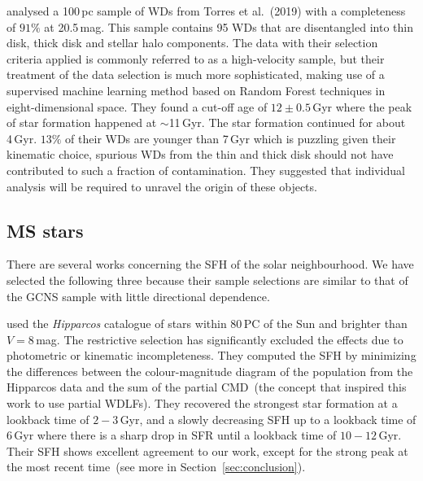 \documentclass[fleqn,usenatbib]{mnras}
\begin{document}
\citet{2021MNRAS.502.1753T} analysed a 100\,pc sample of WDs from
Torres et al.~(2019) with a completeness of $91\%$ at 20.5\,mag. This sample
contains 95 WDs that are disentangled into thin disk, thick disk and stellar
halo components. The data with their selection criteria applied is commonly
referred to as a high-velocity sample, but their treatment of the data
selection is much more sophisticated, making use of a supervised
machine learning method based on Random Forest techniques in eight-dimensional
space. They found a cut-off age of $12\pm0.5$\,Gyr where the peak of star
formation happened at $\sim$11\,Gyr. The star formation continued for about
4\,Gyr. $13\%$ of their WDs are younger than 7\,Gyr which is puzzling given
their kinematic choice, spurious WDs from the thin and thick disk should not
have contributed to such a fraction of contamination. They suggested that
individual analysis will be required to unravel the origin of these objects.

\subsection{MS stars}
There are several works concerning the SFH of the solar neighbourhood. We
have selected the following three because their sample selections are similar
to that of the GCNS sample with little directional dependence.

\citet{2006A&A...459..783C} used the \textit{Hipparcos} catalogue of stars
within 80\,PC of the Sun and brighter than $V=8$\,mag. The restrictive selection
has significantly excluded the effects due to photometric or kinematic
incompleteness. They computed the SFH by minimizing the differences between the
colour-magnitude diagram of the population from the Hipparcos data and the
sum of the partial CMD~(the concept that inspired this work to use partial
WDLFs). They recovered the strongest star formation at a lookback time of
$2-3$\,Gyr, and a slowly decreasing SFH up to a lookback time of $6$\,Gyr where
there is a sharp drop in SFR until a lookback time of $10-12$\,Gyr. Their SFH
shows excellent agreement to our work, except for the strong peak at the most
recent time~(see more in Section~\ref{sec:conclusion}).
\end{document}
